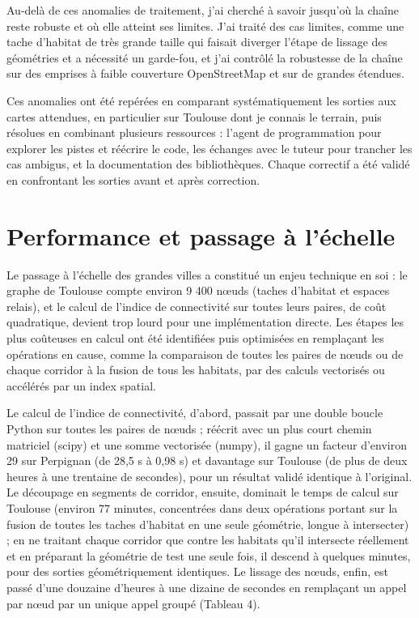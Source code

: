 \documentclass[a4paper,11pt]{report}
\begin{document}
Au-delà de ces anomalies de traitement, j'ai cherché à savoir jusqu'où la chaîne reste robuste et où elle atteint ses limites. J'ai traité des cas limites, comme une tache d'habitat de très grande taille qui faisait diverger l'étape de lissage des géométries et a nécessité un garde-fou, et j'ai contrôlé la robustesse de la chaîne sur des emprises à faible couverture OpenStreetMap et sur de grandes étendues.

Ces anomalies ont été repérées en comparant systématiquement les sorties aux cartes attendues, en particulier sur Toulouse dont je connais le terrain, puis résolues en combinant plusieurs ressources : l'agent de programmation pour explorer les pistes et réécrire le code, les échanges avec le tuteur pour trancher les cas ambigus, et la documentation des bibliothèques. Chaque correctif a été validé en confrontant les sorties avant et après correction.

\section{Performance et passage à l'échelle}\label{sec:6.4}

Le passage à l'échelle des grandes villes a constitué un enjeu technique en soi : le graphe de Toulouse compte environ 9 400 n\oe{}uds (taches d'habitat et espaces relais), et le calcul de l'indice de connectivité sur toutes leurs paires, de coût quadratique, devient trop lourd pour une implémentation directe. Les étapes les plus coûteuses en calcul ont été identifiées puis optimisées en remplaçant les opérations en cause, comme la comparaison de toutes les paires de n\oe{}uds ou de chaque corridor à la fusion de tous les habitats, par des calculs vectorisés ou accélérés par un index spatial.

Le calcul de l'indice de connectivité, d'abord, passait par une double boucle Python sur toutes les paires de n\oe{}uds ; réécrit avec un plus court chemin matriciel (scipy) et une somme vectorisée (numpy), il gagne un facteur d'environ 29 sur Perpignan (de 28,5 s à 0,98 s) et davantage sur Toulouse (de plus de deux heures à une trentaine de secondes), pour un résultat validé identique à l'original. Le découpage en segments de corridor, ensuite, dominait le temps de calcul sur Toulouse (environ 77 minutes, concentrées dans deux opérations portant sur la fusion de toutes les taches d'habitat en une seule géométrie, longue à intersecter) ; en ne traitant chaque corridor que contre les habitats qu'il intersecte réellement et en préparant la géométrie de test une seule fois, il descend à quelques minutes, pour des sorties géométriquement identiques. Le lissage des n\oe{}uds, enfin, est passé d'une douzaine d'heures à une dizaine de secondes en remplaçant un appel par n\oe{}ud par un unique appel groupé (Tableau 4).
\end{document}
